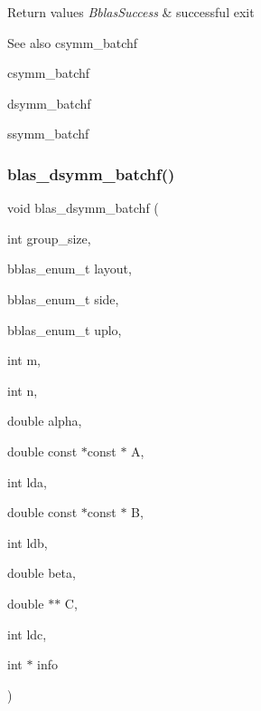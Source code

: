 \begin{DoxyRetVals}{Return values}
{\em Bblas\+Success} & successful exit\\
\hline
\end{DoxyRetVals}
\begin{DoxySeeAlso}{See also}
csymm\+\_\+batchf 

csymm\+\_\+batchf 

dsymm\+\_\+batchf 

ssymm\+\_\+batchf 
\end{DoxySeeAlso}
\mbox{\label{group__symm__batchf_gac8e8bd6f38e2584eef2162a6f5b6464e}} 
\subsubsection{\texorpdfstring{blas\+\_\+dsymm\+\_\+batchf()}{blas\_dsymm\_batchf()}}
{\footnotesize\ttfamily void blas\+\_\+dsymm\+\_\+batchf (\begin{DoxyParamCaption}\item[{int}]{group\+\_\+size,  }\item[{bblas\+\_\+enum\+\_\+t}]{layout,  }\item[{bblas\+\_\+enum\+\_\+t}]{side,  }\item[{bblas\+\_\+enum\+\_\+t}]{uplo,  }\item[{int}]{m,  }\item[{int}]{n,  }\item[{double}]{alpha,  }\item[{double const $\ast$const $\ast$}]{A,  }\item[{int}]{lda,  }\item[{double const $\ast$const $\ast$}]{B,  }\item[{int}]{ldb,  }\item[{double}]{beta,  }\item[{double $\ast$$\ast$}]{C,  }\item[{int}]{ldc,  }\item[{int $\ast$}]{info }\end{DoxyParamCaption})}

